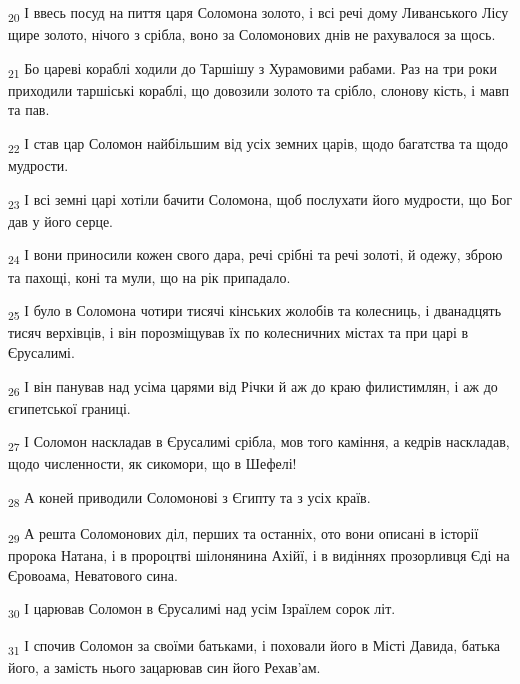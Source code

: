 \begin{tcolorbox}
\textsubscript{20} І ввесь посуд на пиття царя Соломона золото, і всі речі дому Ливанського Лісу щире золото, нічого з срібла, воно за Соломонових днів не рахувалося за щось.
\end{tcolorbox}
\begin{tcolorbox}
\textsubscript{21} Бо цареві кораблі ходили до Таршішу з Хурамовими рабами. Раз на три роки приходили таршіські кораблі, що довозили золото та срібло, слонову кість, і мавп та пав.
\end{tcolorbox}
\begin{tcolorbox}
\textsubscript{22} І став цар Соломон найбільшим від усіх земних царів, щодо багатства та щодо мудрости.
\end{tcolorbox}
\begin{tcolorbox}
\textsubscript{23} І всі земні царі хотіли бачити Соломона, щоб послухати його мудрости, що Бог дав у його серце.
\end{tcolorbox}
\begin{tcolorbox}
\textsubscript{24} І вони приносили кожен свого дара, речі срібні та речі золоті, й одежу, зброю та пахощі, коні та мули, що на рік припадало.
\end{tcolorbox}
\begin{tcolorbox}
\textsubscript{25} І було в Соломона чотири тисячі кінських жолобів та колесниць, і дванадцять тисяч верхівців, і він порозміщував їх по колесничних містах та при царі в Єрусалимі.
\end{tcolorbox}
\begin{tcolorbox}
\textsubscript{26} І він панував над усіма царями від Річки й аж до краю филистимлян, і аж до єгипетської границі.
\end{tcolorbox}
\begin{tcolorbox}
\textsubscript{27} І Соломон наскладав в Єрусалимі срібла, мов того каміння, а кедрів наскладав, щодо численности, як сикомори, що в Шефелі!
\end{tcolorbox}
\begin{tcolorbox}
\textsubscript{28} А коней приводили Соломонові з Єгипту та з усіх країв.
\end{tcolorbox}
\begin{tcolorbox}
\textsubscript{29} А решта Соломонових діл, перших та останніх, ото вони описані в історії пророка Натана, і в пророцтві шілонянина Ахійї, і в видіннях прозорливця Єді на Єровоама, Неватового сина.
\end{tcolorbox}
\begin{tcolorbox}
\textsubscript{30} І царював Соломон в Єрусалимі над усім Ізраїлем сорок літ.
\end{tcolorbox}
\begin{tcolorbox}
\textsubscript{31} І спочив Соломон за своїми батьками, і поховали його в Місті Давида, батька його, а замість нього зацарював син його Рехав'ам.
\end{tcolorbox}
